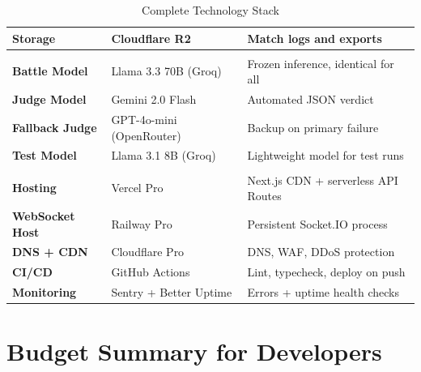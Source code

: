 \documentclass[11pt, a4paper]{article}
\begin{document}
\begin{table}[H]
\begin{tabularx}{\textwidth}{>{\bfseries}l l X}
Storage        & Cloudflare R2           & Match logs and exports \\
\midrule
\multicolumn{3}{l}{\textcolor{infopurple}{\textbf{AI Layer}}} \\
\midrule
Battle Model   & Llama 3.3 70B (Groq)    & Frozen inference, identical for all \\
Judge Model    & Gemini 2.0 Flash        & Automated JSON verdict \\
Fallback Judge & GPT-4o-mini (OpenRouter) & Backup on primary failure \\
Test Model     & Llama 3.1 8B (Groq)     & Lightweight model for test runs \\
\midrule
\multicolumn{3}{l}{\textcolor{darktext}{\textbf{DevOps}}} \\
\midrule
Hosting        & Vercel Pro              & Next.js CDN + serverless API Routes \\
WebSocket Host & Railway Pro             & Persistent Socket.IO process \\
DNS + CDN      & Cloudflare Pro          & DNS, WAF, DDoS protection \\
CI/CD          & GitHub Actions          & Lint, typecheck, deploy on push \\
Monitoring     & Sentry + Better Uptime  & Errors + uptime health checks \\
\bottomrule
\end{tabularx}
\caption{Complete Technology Stack}
\end{table}

\section{Budget Summary for Developers}
\end{document}

